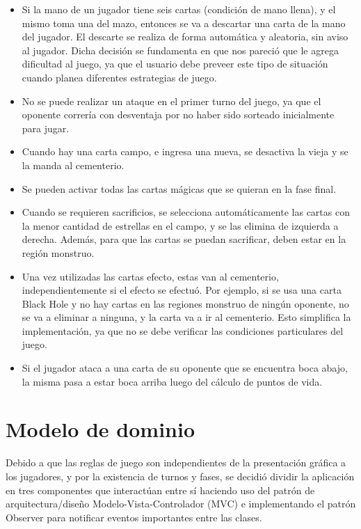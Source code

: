 	\begin{itemize}
		\item Si la mano de un jugador tiene seis cartas (condición de mano llena), y el mismo toma una del mazo, entonces se va a descartar una carta de la mano del jugador. El descarte se realiza de forma automática y aleatoria, sin aviso al jugador. Dicha decisión se fundamenta en que nos pareció que le agrega dificultad al juego, ya que el usuario debe preveer este tipo de situación cuando planea diferentes estrategias de juego.
		
		\item No se puede realizar un ataque en el primer turno del juego, ya que el oponente correría con desventaja por no haber sido sorteado inicialmente para jugar.
		
		\item Cuando hay una carta campo, e ingresa una nueva, se desactiva la vieja y se la manda al cementerio.
		
		\item Se pueden activar todas las cartas mágicas que se quieran en la fase final.
		
		\item Cuando se requieren sacrificios, se selecciona automáticamente las cartas con la menor cantidad de estrellas 
		en el campo, y se las elimina de izquierda a derecha. Además, para que las cartas se puedan sacrificar, deben estar 
		en la región monstruo.
		
		\item Una vez utilizadas las cartas efecto, estas van al cementerio, independientemente si el efecto se efectuó. Por ejemplo, si se usa una carta Black Hole y no hay cartas en las regiones monstruo de ningún oponente, no se va a eliminar a ninguna, y la carta va a ir al cementerio. Esto simplifica la implementación, ya que no se debe verificar las condiciones particulares del juego.
		
		\item Si el jugador ataca a una carta de su oponente que se encuentra boca abajo, la misma pasa a estar boca arriba luego del cálculo de puntos de vida.
	\end{itemize}
	
	\section{Modelo de dominio}
	
	Debido a que las reglas de juego son independientes de la presentación gráfica a los jugadores, y por la existencia de turnos y fases, se decidió dividir la aplicación en tres componentes que interactúan entre sí haciendo uso del patrón de arquitectura/diseño Modelo-Vista-Controlador (MVC) e implementando el patrón Observer para notificar eventos importantes entre las clases.
	
